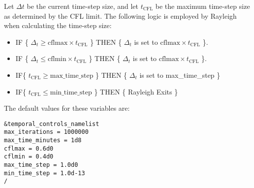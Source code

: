 Let $\Delta t$ be the current time-step size, and let $t_\mathrm{CFL}$ be the maximum time-step size as determined by the CFL limit.  The following logic is employed by Rayleigh when calculating the time-step size:
\begin{itemize}
\item IF \{ $\Delta_t\ge \mathrm{cflmax}\times t_\mathrm{CFL}$ \} THEN \{ $\Delta_t$ is set to $\mathrm{cflmax}\times t_\mathrm{CFL}$ \}.
\item IF \{ $\Delta_t\le \mathrm{cflmin}\times t_\mathrm{CFL}$ \} THEN \{ $\Delta_t$ is set to $\mathrm{cflmax}\times t_\mathrm{CFL}$ \}.
\item IF\{ $t_\mathrm {CFL}\ge \mathrm{max\_time\_step} $ \} THEN \{ $\Delta_t$ is set to max\_time\_step \}
\item IF\{ $t_\mathrm {CFL}\le \mathrm{min\_time\_step} $ \} THEN \{ Rayleigh Exits \}
\end{itemize}

The default values for these variables are:
\begin{lstlisting}
&temporal_controls_namelist
max_iterations = 1000000
max_time_minutes = 1d8
cflmax = 0.6d0
cflmin = 0.4d0
max_time_step = 1.0d0
min_time_step = 1.0d-13
/
\end{lstlisting}
